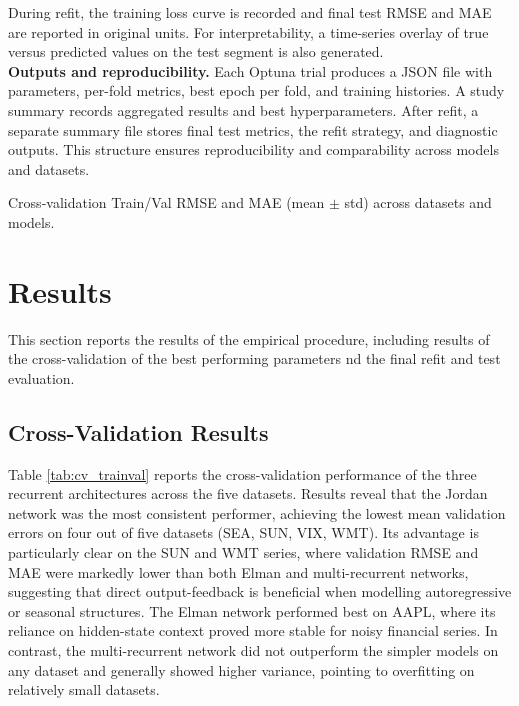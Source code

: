 \documentclass[conference]{IEEEtran}
\begin{document}
During refit, the training loss curve is recorded and final test RMSE and MAE are reported in original units. For interpretability, a time-series overlay of true versus predicted values on the test segment is also generated.\\

\noindent \textbf{Outputs and reproducibility.}
Each Optuna trial produces a JSON file with parameters, per-fold metrics, best epoch per fold, and training histories. A study summary records aggregated results and best hyperparameters. After refit, a separate summary file stores final test metrics, the refit strategy, and diagnostic outputs. This structure ensures reproducibility and comparability across models and datasets.


\begin{table*}[t]
    \centering
    \caption{Cross-validation Train/Val RMSE and MAE (mean $\pm$ std) across datasets and models.}
    \label{tab:cv_trainval}
    
\end{table*}

\section{\textbf{Results}}
This section reports the results of the empirical procedure, including results of the cross-validation of the best performing parameters nd the final refit and test evaluation.


\subsection{Cross-Validation Results}
Table \ref{tab:cv_trainval} reports the cross-validation performance of the three recurrent architectures across the five datasets. Results reveal that the Jordan network was the most consistent performer, achieving the lowest mean validation errors on four out of five datasets (SEA, SUN, VIX, WMT). Its advantage is particularly clear on the SUN and WMT series, where validation RMSE and MAE were markedly lower than both Elman and multi-recurrent networks, suggesting that direct output-feedback is beneficial when modelling autoregressive or seasonal structures. The Elman network performed best on AAPL, where its reliance on hidden-state context proved more stable for noisy financial series. In contrast, the multi-recurrent network did not outperform the simpler models on any dataset and generally showed higher variance, pointing to overfitting on relatively small datasets.
\end{document}
